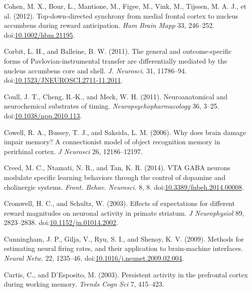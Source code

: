 \documentclass[
  11pt,
  a4paper,
]{scrbook}
\newlength{\cslhangindent}
\newenvironment{CSLReferences}[2] %
 {\begin{list}{}{%
  \setlength{\itemindent}{0pt}
  \setlength{\leftmargin}{0pt}
  \setlength{\parsep}{0pt}
  \ifodd #1
   \setlength{\leftmargin}{\cslhangindent}
   \setlength{\itemindent}{-1\cslhangindent}
  \fi
  \setlength{\itemsep}{#2\baselineskip}}}
 {\end{list}}
\begin{document}
\begin{CSLReferences}{1}{1}
Cohen, M. X., Bour, L., Mantione, M., Figee, M., Vink, M., Tijssen, M.
A. J., et al. (2012). {Top-down-directed synchrony from medial frontal
cortex to nucleus accumbens during reward anticipation.} \emph{Hum Brain
Mapp} 33, 246--252.
doi:\href{https://doi.org/10.1002/hbm.21195}{10.1002/hbm.21195}.

Corbit, L. H., and Balleine, B. W. (2011). {The general and
outcome-specific forms of Pavlovian-instrumental transfer are
differentially mediated by the nucleus accumbens core and shell.}
\emph{J. Neurosci.} 31, 11786--94.
doi:\href{https://doi.org/10.1523/JNEUROSCI.2711-11.2011}{10.1523/JNEUROSCI.2711-11.2011}.

Coull, J. T., Cheng, R.-K., and Meck, W. H. (2011). {Neuroanatomical and
neurochemical substrates of timing.} \emph{Neuropsychopharmacology} 36,
3--25.
doi:\href{https://doi.org/10.1038/npp.2010.113}{10.1038/npp.2010.113}.

Cowell, R. A., Bussey, T. J., and Saksida, L. M. (2006). Why does brain
damage impair memory? {A} connectionist model of object recognition
memory in perirhinal cortex. \emph{J Neurosci} 26, 12186--12197.

Creed, M. C., Ntamati, N. R., and Tan, K. R. (2014). VTA GABA neurons
modulate specific learning behaviors through the control of dopamine and
cholinergic systems. \emph{Front. Behav. Neurosci.} 8, 8.
doi:\href{https://doi.org/10.3389/fnbeh.2014.00008}{10.3389/fnbeh.2014.00008}.

Cromwell, H. C., and Schultz, W. (2003). Effects of expectations for
different reward magnitudes on neuronal activity in primate striatum.
\emph{J Neurophysiol} 89, 2823--2838.
doi:\href{https://doi.org/10.1152/jn.01014.2002}{10.1152/jn.01014.2002}.

Cunningham, J. P., Gilja, V., Ryu, S. I., and Shenoy, K. V. (2009).
{Methods for estimating neural firing rates, and their application to
brain-machine interfaces.} \emph{Neural Netw.} 22, 1235--46.
doi:\href{https://doi.org/10.1016/j.neunet.2009.02.004}{10.1016/j.neunet.2009.02.004}.

Curtis, C., and D'Esposito, M. (2003). Persistent activity in the
prefrontal cortex during working memory. \emph{Trends Cogn Sci} 7,
415--423.


\end{CSLReferences}
\end{document}
